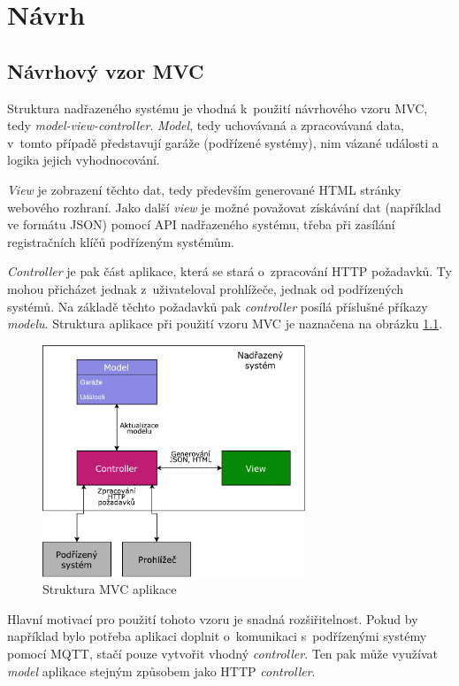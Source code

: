 \chapter{Návrh}
\label{sec:de}

\section{Návrhový vzor MVC}

Struktura nadřazeného systému je vhodná k~použití návrhového vzoru MVC, tedy \textit{model-view-controller}. \textit{Model}, tedy  uchovávaná a zpracovávaná data, v~tomto případě představují garáže (podřízené systémy), nim vázané události a logika jejich vyhodnocování. 

\textit{View} je zobrazení těchto dat, tedy především generované HTML stránky webového rozhraní. Jako další \textit{view} je možné považovat získávání dat (například ve formátu JSON) pomocí API nadřazeného systému, třeba při zasílání registračních klíčů podřízeným systémům.

\textit{Controller} je pak část aplikace, která se stará o~zpracování HTTP požadavků. Ty mohou přicházet jednak z~uživateloval prohlížeče, jednak od podřízených systémů. Na základě těchto požadavků pak \textit{controller} posílá příslušné příkazy \textit{modelu}. Struktura aplikace při použití vzoru MVC je naznačena na obrázku \ref{fig:mvc}.

\begin{figure}[h!]
    \centering
    \includegraphics[width=0.7\textwidth]{images/mvc.pdf}
    \caption{Struktura MVC aplikace}
    \label{fig:mvc}
\end{figure}

Hlavní motivací pro použití tohoto vzoru je snadná rozšiřitelnost. Pokud by například bylo potřeba aplikaci doplnit o~komunikaci s~podřízenými systémy pomocí MQTT, stačí pouze vytvořit vhodný \textit{controller}. Ten pak může využívat \textit{model} aplikace stejným způsobem jako HTTP \textit{controller}.

